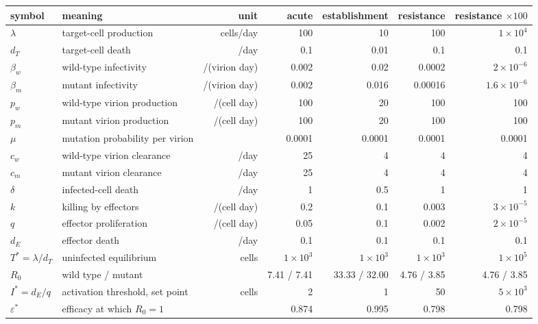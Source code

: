 \begin{tabular}{llrrrrr}
\toprule
symbol & meaning & unit & acute & establishment & resistance & resistance $\times 100$ \\
\midrule
$\lambda$ & target-cell production & cells/day & 100 & 10 & 100 & $1\times 10^{4}$ \\
$d_T$ & target-cell death & /day & 0.1 & 0.01 & 0.1 & 0.1 \\
$\beta_w$ & wild-type infectivity & /(virion day) & 0.002 & 0.02 & 0.0002 & $2\times 10^{-6}$ \\
$\beta_m$ & mutant infectivity & /(virion day) & 0.002 & 0.016 & 0.00016 & $1.6\times 10^{-6}$ \\
$p_w$ & wild-type virion production & /(cell day) & 100 & 20 & 100 & 100 \\
$p_m$ & mutant virion production & /(cell day) & 100 & 20 & 100 & 100 \\
$\mu$ & mutation probability per virion &  & 0.0001 & 0.0001 & 0.0001 & 0.0001 \\
$c_w$ & wild-type virion clearance & /day & 25 & 4 & 4 & 4 \\
$c_m$ & mutant virion clearance & /day & 25 & 4 & 4 & 4 \\
$\delta$ & infected-cell death & /day & 1 & 0.5 & 1 & 1 \\
$k$ & killing by effectors & /(cell day) & 0.2 & 0.1 & 0.003 & $3\times 10^{-5}$ \\
$q$ & effector proliferation & /(cell day) & 0.05 & 0.1 & 0.002 & $2\times 10^{-5}$ \\
$d_E$ & effector death & /day & 0.1 & 0.1 & 0.1 & 0.1 \\
\midrule
$T^* = \lambda/d_T$ & uninfected equilibrium & cells & $1\times 10^{3}$ & $1\times 10^{3}$ & $1\times 10^{3}$ & $1\times 10^{5}$ \\
$R_0$ & wild type / mutant & & 7.41 / 7.41 & 33.33 / 32.00 & 4.76 / 3.85 & 4.76 / 3.85 \\
$I^* = d_E/q$ & activation threshold, set point & cells & 2 & 1 & 50 & $5\times 10^{3}$ \\
$\varepsilon^*$ & efficacy at which $R_0 = 1$ & & 0.874 & 0.995 & 0.798 & 0.798 \\
\bottomrule
\end{tabular}
